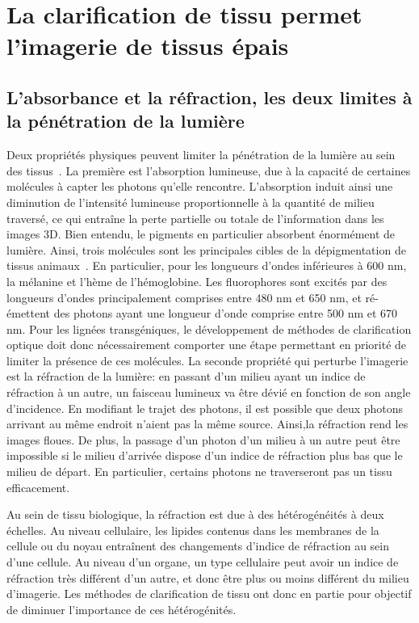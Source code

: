 \documentclass[\main/main.tex]{subfiles}
\begin{document}
\section{La clarification de tissu permet l'imagerie de tissus épais}

\subsection{L'absorbance et la réfraction, les deux limites à la pénétration de la lumière}

%
Deux propriétés physiques peuvent limiter la pénétration de la lumière au sein des tissus~\cite{sandell_2011}. La première est l'absorption lumineuse, due à la capacité de certaines molécules à capter les photons qu'elle rencontre.
%
L'absorption induit ainsi une diminution de l'intensité lumineuse proportionnelle à la quantité de milieu traversé, ce qui entraîne la perte partielle ou totale de l'information dans les images 3D.
%
Bien entendu, le pigments en particulier absorbent énormément de lumière. Ainsi, trois molécules sont les principales cibles de la dépigmentation de tissus animaux~\cite{sandell_2011,antinucci_2016,pende_2020}. En particulier, pour les longueurs d'ondes inférieures à 600 nm, la mélanine et l'hème de l'hémoglobine. Les fluorophores sont excités par des longueurs d'ondes principalement comprises entre 480 nm et 650 nm, et ré-émettent des photons ayant une longueur d'onde comprise entre 500 nm et 670 nm.
Pour les lignées transgéniques, le développement de méthodes de clarification optique doit donc nécessairement comporter une étape permettant en priorité de limiter la présence de ces molécules.
%
La seconde propriété qui perturbe l'imagerie est la réfraction de la lumière: en passant d'un milieu ayant un indice de réfraction à un autre, un faisceau lumineux va être dévié en fonction de son angle d'incidence. En modifiant le trajet des photons, il est possible que deux photons arrivant au même endroit n'aient pas la même source. Ainsi,la réfraction rend les images floues.
%
De plus, la passage d'un photon d'un milieu à un autre peut être impossible si le milieu d'arrivée dispose d'un indice de réfraction plus bas que le milieu de départ. En particulier, certains photons ne traverseront pas un tissu efficacement.

%
Au sein de tissu biologique, la réfraction est due à des hétérogénéités à deux échelles. Au niveau cellulaire, les lipides contenus dans les membranes de la cellule ou du noyau entraînent des changements d'indice de réfraction au sein d'une cellule. Au niveau d'un organe, un type cellulaire peut avoir un indice de réfraction très différent d'un autre, et donc être plus ou moins différent du milieu d'imagerie.
%
Les méthodes de clarification de tissu ont donc en partie pour objectif de diminuer l'importance de ces hétérogénités.
\end{document}
